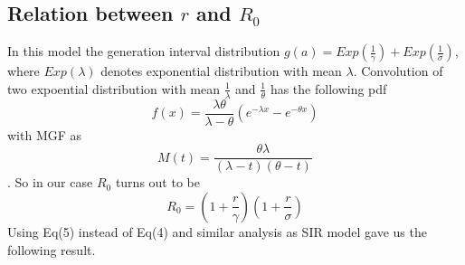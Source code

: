 \documentclass{article}
\begin{document}
\subsection{Relation between $r$ and $R_{0}$}
In this model the generation interval distribution
$g(a)=Exp(\frac{1}{\gamma})+Exp(\frac{1}{\sigma})$, where $Exp(\lambda)$
denotes exponential distribution with mean $\lambda$. \newline
Convolution of two expoential distribution with mean
$\frac{1}{\lambda}$ and $\frac{1}{\theta}$ has the following pdf
$$f(x)=\frac{\lambda \theta}{\lambda - \theta}(e^{- \lambda x}-e^{-\theta x})$$
with MGF as
$$M(t)=\frac{\theta \lambda}{(\lambda-t)(\theta-t)}$$.
So in our case $R_{0}$ turns out to be
\begin{equation}
R_{0}=(1+\frac{r}{\gamma})(1+\frac{r}{\sigma})
\end{equation}
Using Eq(5) instead of Eq(4) and similar analysis as SIR model gave us the following result.
\end{document}
